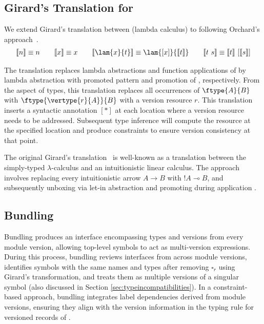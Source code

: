 \subsection{Girard's Translation for \vlmini{}}
\label{sec:VLMini}
We extend Girard's translation between \mylang{} (lambda calculus) to \vlmini{} following Orchard's approach~\cite{Orchard:2019:Granule}.
\begin{align*}
\llbracket n \rrbracket \equiv n \qquad
\llbracket x \rrbracket \equiv x \qquad
\llbracket \lam{x}{t} \rrbracket \equiv \lam{[x]}{\llbracket t \rrbracket} \qquad
\llbracket t\ s\rrbracket \equiv \llbracket t\rrbracket\ [ \llbracket s \rrbracket ]
\end{align*}

The translation replaces lambda abstractions and function applications of \mylang{} by lambda abstraction with promoted pattern and promotion of \vlmini{}, respectively. From the aspect of types, this translation replaces all occurrences of $\ftype{A}{B}$ with $\ftype{\vertype{r}{A}}{B}$ with a version resource $r$.
This translation inserts a syntactic annotation $[*]$ at each location where a version resource needs to be addressed. Subsequent type inference will compute the resource at the specified location and produce constraints to ensure version consistency at that point.

The original Girard's translation~\cite{girardlinear1987} is well-known as a translation between the simply-typed $\lambda $-calculus and an intuitionistic linear calculus. The approach involves replacing every intuitionistic arrow $A \rightarrow B$ with $!A \multimap B$, and subsequently unboxing via let-in abstraction and promoting during application \cite{Orchard:2019:Granule}.













\subsection{Bundling}
\label{sec:bundling}
Bundling produces an interface encompassing types and versions from every module version, allowing top-level symbols to act as multi-version expressions. During this process, bundling reviews interfaces from across module versions, identifies symbols with the same names and types after removing $\square_r$ using Girard's transformation, and treats them as multiple versions of a singular symbol (also discussed in Section \ref{sec:typeincompatibilities}). In a constraint-based approach, bundling integrates label dependencies derived from module versions, ensuring they align with the version information in the typing rule for versioned records of \corelang{}.

